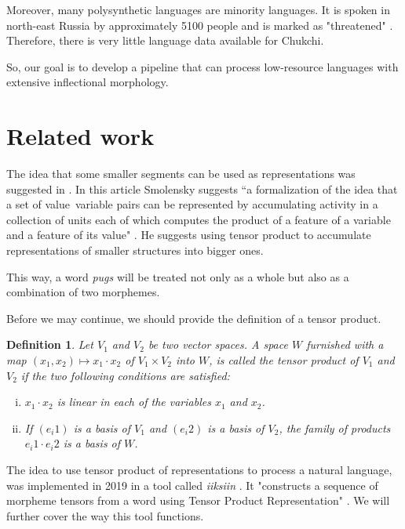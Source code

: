 \documentclass[leqno]{article}
\newtheorem{theorem}{Definition}
\begin{document}
Moreover, many polysynthetic languages are minority languages.
It is spoken in north-east Russia by approximately 5100 people
and is marked as "threatened" \parencite{ethn}. Therefore, there is very little
language data available for Chukchi.

So, our goal is to develop a pipeline that can process
low-resource languages with extensive inflectional morphology.

\section{Related work}

The idea that some smaller segments can be used as representations was suggested in \parencite{tpr1990}.
In this article Smolensky suggests ``a formalization of the idea that a set of value~variable
pairs can be represented by accumulating activity in a collection of units each of which computes the
product of a feature of a variable and a feature of its value" \parencite[p. 159]{tpr1990}.
He suggests using tensor product to accumulate representations of smaller structures into
bigger ones.

This way, a word \textit{pugs} will be treated not only as a whole but also as a combination
of two morphemes.

Before we may continue, we should provide the definition of a tensor product.

\begin{theorem}
Let $V_1$ and $V_2$ be two vector spaces.
A space $W$ furnished with a map $(x_1, x_2) \mapsto x_1 \cdot x_2$
of $V_1 \times V_2$ into $W$,
is called the tensor product of $V_1$ and $V_2$ if the two following conditions are satisfied:
\begin{enumerate}[i.]
    \item $x_1 \cdot x_2$ is linear in each of the variables $x_1$ and $x_2$.
    \item If $(e_i1)$ is a basis of $V_1$ and $(e_i2)$ is a basis of $V_2$, the family of products $e_i1 \cdot e_i2$ is a basis of $W$.
\end{enumerate}
\end{theorem} \parencite[p. 8]{tensorProduct}


The idea to use tensor product of representations to process a natural language, was implemented in 2019 in a tool called \textit{iiksiin} \parencite{schwartz2020neural, iiksiin}.
It "constructs a sequence of morpheme tensors from a word using Tensor Product Representation"
\parencite{iiksiin}. We will further cover the way this tool functions.
\end{document}
